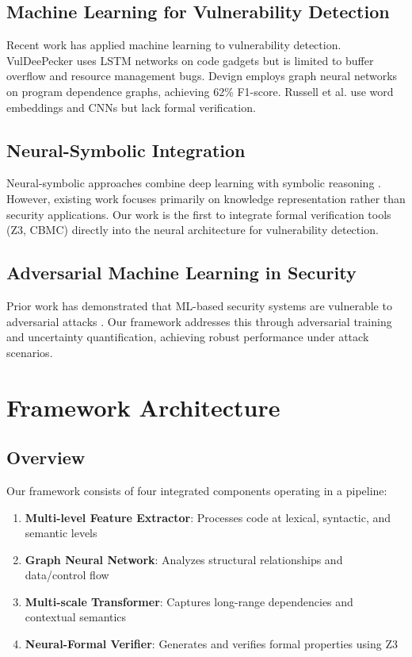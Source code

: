 \documentclass[10pt,journal,compsoc]{IEEEtran}
\begin{document}
\subsection{Machine Learning for Vulnerability Detection}
Recent work has applied machine learning to vulnerability detection. VulDeePecker \cite{li2018vuldeepecker} uses LSTM networks on code gadgets but is limited to buffer overflow and resource management bugs. Devign \cite{zhou2019devign} employs graph neural networks on program dependence graphs, achieving 62\% F1-score. Russell et al. \cite{russell2018automated} use word embeddings and CNNs but lack formal verification.

\subsection{Neural-Symbolic Integration}
Neural-symbolic approaches combine deep learning with symbolic reasoning \cite{garcez2019neural}. However, existing work focuses primarily on knowledge representation rather than security applications. Our work is the first to integrate formal verification tools (Z3, CBMC) directly into the neural architecture for vulnerability detection.

\subsection{Adversarial Machine Learning in Security}
Prior work has demonstrated that ML-based security systems are vulnerable to adversarial attacks \cite{carlini2017adversarial}. Our framework addresses this through adversarial training and uncertainty quantification, achieving robust performance under attack scenarios.

\section{Framework Architecture}

\subsection{Overview}
Our framework consists of four integrated components operating in a pipeline:

\begin{enumerate}
\item \textbf{Multi-level Feature Extractor}: Processes code at lexical, syntactic, and semantic levels
\item \textbf{Graph Neural Network}: Analyzes structural relationships and data/control flow
\item \textbf{Multi-scale Transformer}: Captures long-range dependencies and contextual semantics
\item \textbf{Neural-Formal Verifier}: Generates and verifies formal properties using Z3
\end{enumerate}
\end{document}

